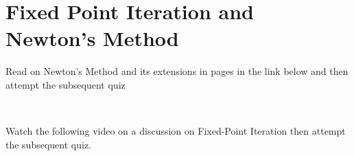 \section{Fixed Point Iteration and Newton's Method}
\activities
Read on Newton's Method and its extensions in pages in the link below and then attempt the subsequent quiz
\begin{activity}[\cg Reading]
\end{activity}
\\
\begin{youtube}[]
Watch the following video on  a discussion on Fixed-Point Iteration then attempt the subsequent quiz.\\
\end{youtube}

